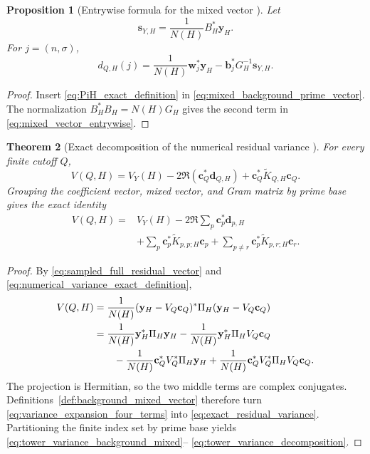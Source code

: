 \documentclass[11pt]{amsart}
\numberwithin{equation}{section}
\theoremstyle{plain}
\newtheorem{theorem}{Theorem}[section]
\newtheorem{proposition}[theorem]{Proposition}
\theoremstyle{definition}
\theoremstyle{remark}
\newcommand{\1}{\mathbf{1}}
\begin{document}
\begin{proposition}[Entrywise formula for the mixed vector {}]
\label{prop:mixed_vector_entrywise}
Let
\begin{equation}
\mathbf s_{Y,H}
=
\frac1{N(H)}B_H^\ast\mathbf y_H.
\label{eq:background_removed_coordinates}
\end{equation}
For $j=(n,\sigma)$,
\begin{equation}
\boxed{
 d_{Q,H}(j)
=
\frac1{N(H)}\mathbf w_j^\ast\mathbf y_H
-
\mathbf b_j^\ast G_H^{-1}\mathbf s_{Y,H}.
}
\label{eq:mixed_vector_entrywise}
\end{equation}
\end{proposition}

\begin{proof}
Insert \eqref{eq:PiH_exact_definition} in
\eqref{eq:mixed_background_prime_vector}.  The normalization
$B_H^\ast B_H=N(H)G_H$ gives the second term in
\eqref{eq:mixed_vector_entrywise}.
\end{proof}


\begin{theorem}[Exact decomposition of the numerical residual variance {}]
\label{thm:exact_system_variance}
For every finite cutoff $Q$,
\begin{equation}
\boxed{
V(Q,H)
=
V_Y(H)
-
2\Re\left(\mathbf c_Q^\ast\mathbf d_{Q,H}\right)
+
\mathbf c_Q^\ast\widetilde K_{Q,H}\mathbf c_Q.
}
\label{eq:exact_residual_variance}
\end{equation}
Grouping the coefficient vector, mixed vector, and Gram matrix by prime
base gives the exact identity
\begin{align}
V(Q,H)
={}&
V_Y(H)
-
2\Re\sum_p\mathbf c_p^\ast\mathbf d_{p,H}
\label{eq:tower_variance_background_mixed}
\\
&+
\sum_p
\mathbf c_p^\ast\widetilde K_{p,p;H}\mathbf c_p
+
\sum_{p\neq r}
\mathbf c_p^\ast\widetilde K_{p,r;H}\mathbf c_r.
\label{eq:tower_variance_decomposition}
\end{align}
\end{theorem}

\begin{proof}
By \eqref{eq:sampled_full_residual_vector} and
\eqref{eq:numerical_variance_exact_definition},
\begin{align}
V(Q,H)
&=
\frac1{N(H)}
(\mathbf y_H-V_Q\mathbf c_Q)^\ast
\Pi_H
(\mathbf y_H-V_Q\mathbf c_Q)
\label{eq:variance_expansion_start}
\\
&=
\frac1{N(H)}\mathbf y_H^\ast\Pi_H\mathbf y_H
-
\frac1{N(H)}\mathbf y_H^\ast\Pi_HV_Q\mathbf c_Q
\notag
\\
&\qquad
-
\frac1{N(H)}\mathbf c_Q^\ast V_Q^\ast\Pi_H\mathbf y_H
+
\frac1{N(H)}\mathbf c_Q^\ast V_Q^\ast\Pi_HV_Q\mathbf c_Q.
\label{eq:variance_expansion_four_terms}
\end{align}
The projection is Hermitian, so the two middle terms are complex
conjugates.  Definitions~\ref{def:background_mixed_vector} therefore turn
\eqref{eq:variance_expansion_four_terms} into
\eqref{eq:exact_residual_variance}.  Partitioning the finite index set by
prime base yields \eqref{eq:tower_variance_background_mixed}--
\eqref{eq:tower_variance_decomposition}.
\end{proof}
\end{document}
